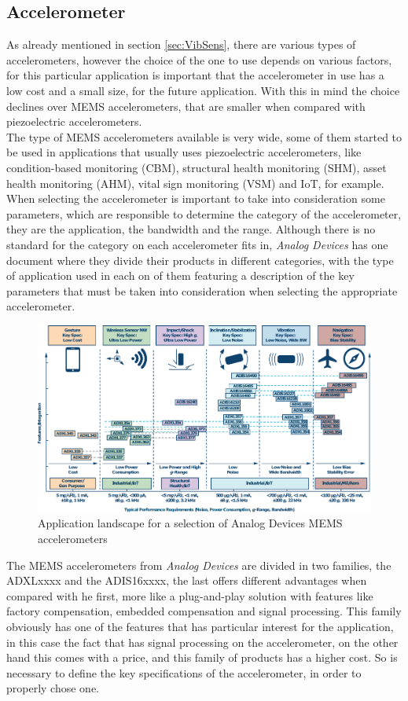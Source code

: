 \subsection{Accelerometer}
As already mentioned in section \ref{sec:VibSens}, there are various types of accelerometers, however the choice of the one to use depends on various factors, for this particular application is important that the accelerometer in use has a low cost and a small size, for the future application. With this in mind the choice declines over MEMS accelerometers, that are smaller when compared with piezoelectric accelerometers.\\
The type of MEMS accelerometers available is very wide, some of them started to be used in applications that usually uses piezoelectric accelerometers, like condition-based monitoring (CBM), structural health monitoring (SHM), asset health monitoring (AHM), vital sign monitoring (VSM) and IoT, for example. When selecting the accelerometer is important to take into consideration some parameters, which are responsible to determine the category of the accelerometer, they are the application, the bandwidth and the range. Although there is no standard for the category on each accelerometer fits in, \textit{Analog Devices} has one document where they divide their products in different categories, with the type of application used in each on of them featuring a description of the key parameters that must be taken into consideration when selecting the appropriate accelerometer.
\begin{figure}[!htb]
    \centering
    \includegraphics[width=1\textwidth]{Chapters/3CHP/Images/adTable.pdf}
    \caption{Application landscape for a selection of Analog Devices MEMS accelerometers}
    \label{fig:adtable}
\end{figure}
The MEMS accelerometers from \textit{Analog Devices} are divided in two families, the ADXLxxxx and the ADIS16xxxx, the last offers different advantages when compared with he first, more like a plug-and-play solution with features like factory compensation, embedded compensation and signal processing. This family obviously has one of the features that has particular interest for the application, in this case the fact that has signal processing on the accelerometer, on the other hand this comes with a price, and this family of products has a higher cost. So is necessary to define the key specifications of the accelerometer, in order to properly chose one\cite{AnalogDialogue51102017}\cite{AnalogDialogue51112017}.\\
